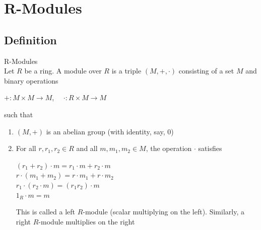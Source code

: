 \documentclass{report}
\begin{document}
\setcounter{section}{1} %

\chapter{R-Modules}
\section{Definition}
\begin{definition}{R-Modules}{} \\
Let $R$ be a ring. A module over $R$ is a triple $(M, +, \cdot )$ consisting of a set $M$ and binary operations
\begin{center}
    $+:M\times M \to M$, \ \ $\cdot :R\times M\to M$
\end{center}
such that
\begin{enumerate}
    \item $(M, +)$ is an abelian group (with identity, say, $0$)
    \item For all $r,r_1,r_2\in R$ and all $m,m_1,m_2\in M$, the operation $\cdot $ satisfies
    \begin{center}
        $(r_1+r_2)\cdot m=r_1 \cdot m+r_2\cdot m$ 
        \\ $r\cdot (m_1+m_2)=r\cdot m_1+r\cdot m_2$ \\
        $r_1 \cdot (r_2 \cdot m)=(r_1 r_2)\cdot m$ \\ $1_R \cdot m=m$
    \end{center}
    This is called a left $R$-module (scalar multiplying on the left). Similarly, a right $R$-module multiplies on the right
\end{enumerate}
\end{definition}
\end{document}
